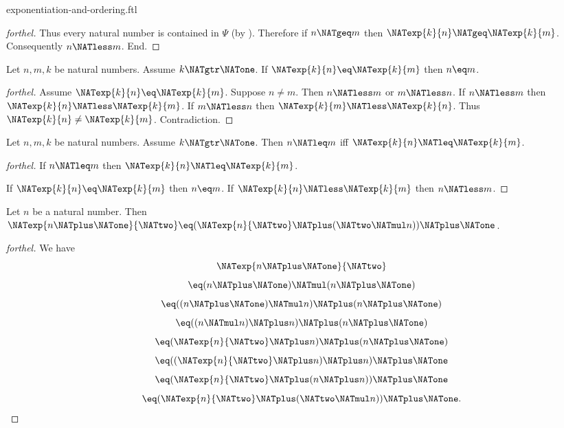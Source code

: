 \documentclass{naproche-library}
\begin{document}
\begin{smodule}[title=Exponentiation and Ordering]{exponentiation-and-ordering.ftl}
\begin{proof}[forthel]
    Thus every natural number is contained in $\Psi$ (by ).
    Therefore if $n \NATgeq m$ then $\NATexp{k}{n} \NATgeq \NATexp{k}{m}$.
    Consequently $n \NATless m$.
  End.
\end{proof}

\begin{corollary}[forthel,id=ARITHMETIC_09_6780506905509888]
  Let $n, m, k$ be natural numbers.
  Assume $k \NATgtr \NATone$.
  If $\NATexp{k}{n} \eq \NATexp{k}{m}$ then $n \eq m$.
\end{corollary}
\begin{proof}[forthel]
  Assume $\NATexp{k}{n} \eq \NATexp{k}{m}$.
  Suppose $n \neq m$.
  Then $n \NATless m$ or $m \NATless n$.
  If $n \NATless m$ then $\NATexp{k}{n} \NATless \NATexp{k}{m}$.
  If $m \NATless n$ then $\NATexp{k}{m} \NATless \NATexp{k}{n}$.
  Thus $\NATexp{k}{n} \neq \NATexp{k}{m}$.
  Contradiction.
\end{proof}

\begin{corollary}[forthel,id=ARITHMETIC_09_2876620253691904]
  Let $n, m, k$ be natural numbers.
  Assume $k \NATgtr \NATone$.
  Then $n \NATleq m$ iff $\NATexp{k}{n} \NATleq \NATexp{k}{m}$.
\end{corollary}
\begin{proof}[forthel]
  If $n \NATleq m$ then $\NATexp{k}{n} \NATleq \NATexp{k}{m}$.

  If $\NATexp{k}{n} \eq \NATexp{k}{m}$ then $n \eq m$.
  If $\NATexp{k}{n} \NATless \NATexp{k}{m}$ then $n \NATless m$.
\end{proof}

\begin{proposition}[forthel,id=ARITHMETIC_09_6984104377581568]
  Let $n$ be a natural number.
  Then $\NATexp{n \NATplus \NATone}{\NATtwo} \eq (\NATexp{n}{\NATtwo} \NATplus (\NATtwo \NATmul n)) \NATplus \NATone$.
\end{proposition}
\begin{proof}[forthel]
  We have
  \[  \NATexp{n \NATplus \NATone}{\NATtwo}                       \]
  \[    \eq (n \NATplus \NATone) \NATmul (n \NATplus \NATone)         \]
  \[    \eq ((n \NATplus \NATone) \NATmul n) \NATplus (n \NATplus \NATone)   \]
  \[    \eq ((n \NATmul n) \NATplus n) \NATplus (n \NATplus \NATone)   \]
  \[    \eq (\NATexp{n}{\NATtwo} \NATplus n) \NATplus (n \NATplus \NATone)         \]
  \[    \eq ((\NATexp{n}{\NATtwo} \NATplus n) \NATplus n) \NATplus \NATone         \]
  \[    \eq (\NATexp{n}{\NATtwo} \NATplus (n \NATplus n)) \NATplus \NATone         \]
  \[    \eq (\NATexp{n}{\NATtwo} \NATplus (\NATtwo \NATmul n)) \NATplus \NATone.    \]
\end{proof}


\end{smodule}
\end{document}
